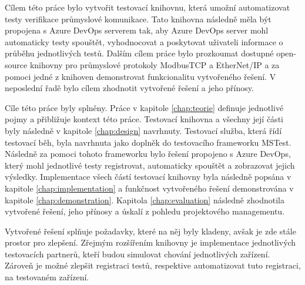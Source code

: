 \begin{conclusion}
Cílem této práce bylo vytvořit testovací knihovnu, která umožní automatizovat testy verifikace průmyslové komunikace. Tato knihovna následně měla být propojena s Azure DevOps serverem tak, aby Azure DevOps server mohl automaticky testy spouštět, vyhodnocovat a poskytovat uživateli informace o průběhu jednotlivých testů. Dalším cílem práce bylo prozkoumat dostupné open-source knihovny pro průmyslové protokoly ModbusTCP a EtherNet/IP a za pomoci jedné z knihoven demonstrovat funkcionalitu vytvořeného řešení. V neposlední řadě bylo cílem zhodnotit vytvořené řešení a jeho přínosy.

Cíle této práce byly splněny. Práce v kapitole \ref{chap:teorie} definuje jednotlivé pojmy a přibližuje kontext této práce. Testovací knihovna a všechny její části byly následně v kapitole \ref{chap:design} navrhnuty. Testovací služba, která řídí testovací běh, byla navrhnuta jako doplněk do testovacího frameworku MSTest. Následně za pomoci tohoto frameworku bylo řešení propojeno s Azure DevOps, který mohl jednotlivé testy registrovat, automaticky spouštět a zobrazovat jejich výsledky. Implementace všech částí testovací knihovny byla následně popsána v kapitole \ref{chap:implementation} a funkčnost vytvořeného řešení demonstrována v kapitole \ref{chap:demonstration}. Kapitola \ref{chap:evaluation} následně zhodnotila vytvořené řešení, jeho přínosy a úskalí z pohledu projektového managementu. 

Vytvořené řešení splňuje požadavky, které na něj byly kladeny, avšak je zde stále prostor pro zlepšení. Zřejmým rozšířením knihovny je implementace jednotlivých testovacích partnerů, kteří budou simulovat chování jednotlivých zařízení. Zároveň je možné zlepšit registraci testů, respektive automatizovat tuto registraci, na testovaném zařízení. 
\end{conclusion}